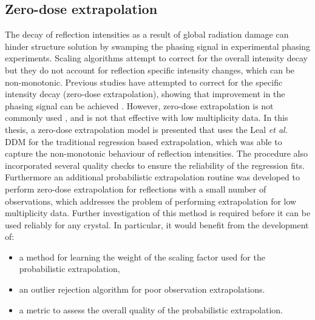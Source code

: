 \subsection{Zero-dose extrapolation}
\label{sub:Zero-dose extrapolation}
The decay of reflection intensities as a result of global radiation damage can hinder structure solution by swamping the phasing signal in experimental phasing experiments.
Scaling algorithms attempt to correct for the overall intensity decay but they do not account for reflection specific intensity changes, which can be non-monotonic.
Previous studies have attempted to correct for the specific intensity decay (zero-dose extrapolation), showing that improvement in the phasing signal can be achieved \cite{diederichs2003,diederichs2006}.
However, zero-dose extrapolation is not commonly used \cite{borek2007many}, and is not that effective with low multiplicity data.
In this thesis, a zero-dose extrapolation model is presented that uses the Leal \textit{et al.} DDM for the traditional regression based extrapolation, which was able to capture the non-monotonic behaviour of reflection intensities.
The procedure also incorporated several quality checks to ensure the reliability of the regression fits.
Furthermore an additional probabilistic extrapolation routine was developed to perform zero-dose extrapolation for reflections with a small number of observations, which addresses the problem of performing extrapolation for low multiplicity data.
Further investigation of this method is required before it can be used reliably for any crystal.
In particular, it would benefit from the development of:
\begin{itemize}
    \item a method for learning the weight of the scaling factor used for the probabilistic extrapolation,
    \item an outlier rejection algorithm for poor observation extrapolations.
    \item a metric to assess the overall quality of the probabilistic extrapolation.
\end{itemize}

